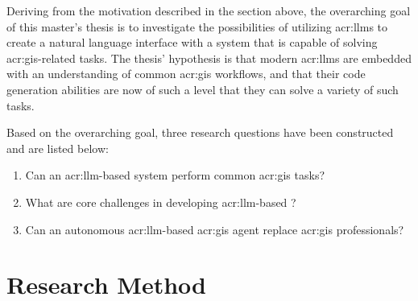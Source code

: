 \begin{comment}
Potentially, how well the goals have been met (and how well the research questions have been answered)
is a theme that you should return to towards the end of the thesis (so in Chapter~\ref{cha:conclusion} and/or Chapter~\ref{cha:discussion}).

For a Specialisation Project, the goal would primarily be to get up to speed with the research field, so the research questions will rather be
limited to exploring what the state-of-the-art is, what methods and data have been used, etc.
A secondary goal of the specialisation is to frame the research questions and goals of the Master's Thesis.
Note that a major difference between the Specialisation Project and the Master's Thesis is that the Master's Thesis work \textit{has\/} to
introduce new research.
Of course the Specialisation Project can also introduce novel work, but there is no such requirement --- and most commonly it does not,
since the core of the project really is to figure out what is ``old'' before you can introduce something which is new.
\end{comment}

Deriving from the motivation described in the section above, the overarching goal of this master's thesis is to investigate the possibilities of utilizing \glspl{acr:llm} to create a natural language interface with a system that is capable of solving \acrshort{acr:gis}-related tasks. The thesis' hypothesis is that modern \glspl{acr:llm} are embedded with an understanding of common \acrshort{acr:gis} workflows, and that their code generation abilities are now of such a level that they can solve a variety of such tasks.

Based on the overarching goal, three research questions have been constructed and are listed below:

\begin{enumerate}
    \item Can an \gls{acr:llm}-based system perform common \acrshort{acr:gis} tasks? \label{rq:gis-question-answering}
    \item What are core challenges in developing \acrshort{acr:llm}-based ? \label{rq:development-challenges}
    \item Can an autonomous \acrshort{acr:llm}-based \acrshort{acr:gis} agent replace \acrshort{acr:gis} professionals? \label{rq:replaing-gis-professionals}
\end{enumerate}

\section{Research Method}
\label{sec:research-method}

